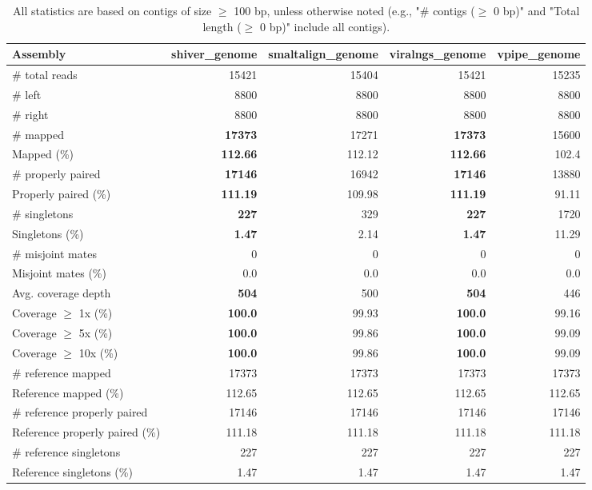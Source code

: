 \documentclass[12pt,a4paper]{article}
\begin{document}
\begin{table}[ht]
\begin{center}
\caption{All statistics are based on contigs of size $\geq$ 100 bp, unless otherwise noted (e.g., "\# contigs ($\geq$ 0 bp)" and "Total length ($\geq$ 0 bp)" include all contigs).}
\begin{tabular}{|l*{4}{|r}|}
\hline
Assembly & shiver\_genome & smaltalign\_genome & viralngs\_genome & vpipe\_genome \\ \hline
\# total reads & 15421 & 15404 & 15421 & 15235 \\ \hline
\# left & 8800 & 8800 & 8800 & 8800 \\ \hline
\# right & 8800 & 8800 & 8800 & 8800 \\ \hline
\# mapped & {\bf 17373} & 17271 & {\bf 17373} & 15600 \\ \hline
Mapped (\%) & {\bf 112.66} & 112.12 & {\bf 112.66} & 102.4 \\ \hline
\# properly paired & {\bf 17146} & 16942 & {\bf 17146} & 13880 \\ \hline
Properly paired (\%) & {\bf 111.19} & 109.98 & {\bf 111.19} & 91.11 \\ \hline
\# singletons & {\bf 227} & 329 & {\bf 227} & 1720 \\ \hline
Singletons (\%) & {\bf 1.47} & 2.14 & {\bf 1.47} & 11.29 \\ \hline
\# misjoint mates & 0 & 0 & 0 & 0 \\ \hline
Misjoint mates (\%) & 0.0 & 0.0 & 0.0 & 0.0 \\ \hline
Avg. coverage depth & {\bf 504} & 500 & {\bf 504} & 446 \\ \hline
Coverage $\geq$ 1x (\%) & {\bf 100.0} & 99.93 & {\bf 100.0} & 99.16 \\ \hline
Coverage $\geq$ 5x (\%) & {\bf 100.0} & 99.86 & {\bf 100.0} & 99.09 \\ \hline
Coverage $\geq$ 10x (\%) & {\bf 100.0} & 99.86 & {\bf 100.0} & 99.09 \\ \hline
\# reference mapped & 17373 & 17373 & 17373 & 17373 \\ \hline
Reference mapped (\%) & 112.65 & 112.65 & 112.65 & 112.65 \\ \hline
\# reference properly paired & 17146 & 17146 & 17146 & 17146 \\ \hline
Reference properly paired (\%) & 111.18 & 111.18 & 111.18 & 111.18 \\ \hline
\# reference singletons & 227 & 227 & 227 & 227 \\ \hline
Reference singletons (\%) & 1.47 & 1.47 & 1.47 & 1.47 \\ \hline

\end{tabular}
\end{center}
\end{table}
\end{document}
